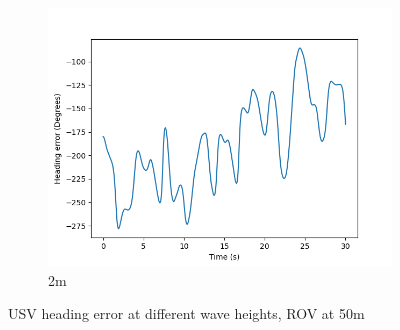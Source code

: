 \documentclass[class=article, crop=false]{standalone}
\begin{document}
\begin{figure}
\begin{subfigure}[b]{0.48\textwidth}
        \includegraphics{scenario1/rov-50m/2.0m/usv_heading_error_controlled}
        \caption{2m}
        \label{}
    \end{subfigure}

    \caption{USV heading error at different wave heights, ROV at 50m}
\end{figure}
\end{document}
